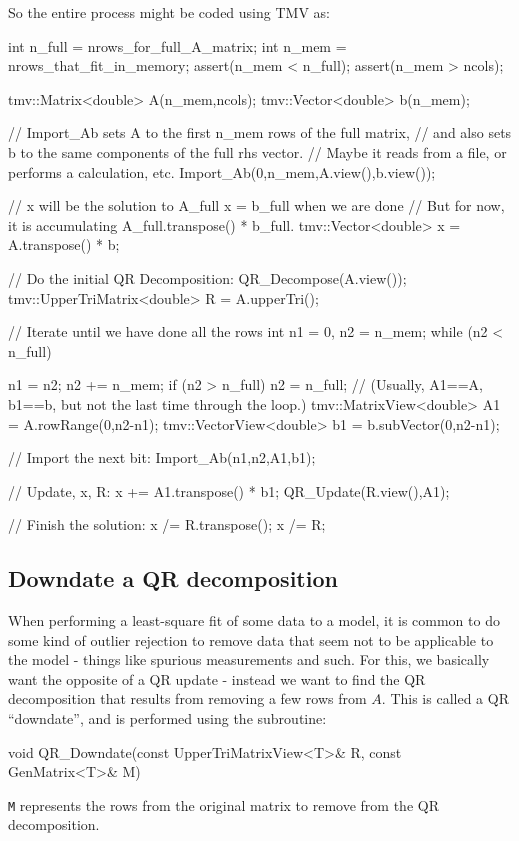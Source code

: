 \documentclass[twoside,letterpaper,11pt]{article}
\renewcommand{\tt}[1]{{\lstinline {#1}}}
\begin{document}
So the entire process might be coded using TMV as:
\begin{tmvcode}
int n_full = nrows_for_full_A_matrix;
int n_mem = nrows_that_fit_in_memory;
assert(n_mem < n_full);
assert(n_mem > ncols);

tmv::Matrix<double> A(n_mem,ncols); 
tmv::Vector<double> b(n_mem);

// Import_Ab sets A to the first n_mem rows of the full matrix, 
// and also sets b to the same components of the full rhs vector.
// Maybe it reads from a file, or performs a calculation, etc.
Import_Ab(0,n_mem,A.view(),b.view());

// x will be the solution to A_full x = b_full when we are done
// But for now, it is accumulating A_full.transpose() * b_full.
tmv::Vector<double> x = A.transpose() * b;

// Do the initial QR Decomposition:
QR_Decompose(A.view());
tmv::UpperTriMatrix<double> R = A.upperTri();

// Iterate until we have done all the rows
int n1 = 0, n2 = n_mem;
while (n2 < n_full) 
{
    n1 = n2; n2 += n_mem;
    if (n2 > n_full) n2 = n_full;
    // (Usually, A1==A, b1==b, but not the last time through the loop.)
    tmv::MatrixView<double> A1 = A.rowRange(0,n2-n1);
    tmv::VectorView<double> b1 = b.subVector(0,n2-n1);

    // Import the next bit:
    Import_Ab(n1,n2,A1,b1);

    // Update, x, R:
    x += A1.transpose() * b1;
    QR_Update(R.view(),A1);
}

// Finish the solution:
x /= R.transpose();
x /= R;
\end{tmvcode}

\subsection{Downdate a QR decomposition}
\label{QRDowndate}

When performing a least-square fit of some data to a model,
it is common to do some kind of outlier rejection to remove data that
seem not to be applicable to the model - things like spurious measurements
and such.
For this, we basically want the opposite of a QR update - instead we want to 
find the QR decomposition that results from
removing a few rows from $A$.  This is called a QR ``downdate'', and is performed
using the subroutine:
\begin{tmvcode}
void QR_Downdate(const UpperTriMatrixView<T>& R, const GenMatrix<T>& M)
\end{tmvcode}
\tt{M} represents the rows from the original matrix to remove from the 
QR decomposition.
\end{document}
